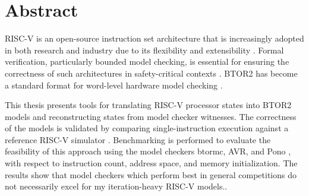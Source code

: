 \chapter*{Abstract}

RISC-V is an open-source instruction set architecture that is
increasingly adopted in both research and industry due to its
flexibility and extensibility \cite{riscv-isa, eu}. Formal
verification, particularly bounded model checking, is essential for
ensuring the correctness of such architectures in safety-critical
contexts \cite{BiereBMC}. BTOR2 has become a standard format for
word-level hardware model checking \cite{btor2, HWMCC}.

This thesis presents tools for translating RISC-V processor states
into BTOR2 models and reconstructing states from model checker
witnesses. The correctness of the models is validated by comparing
single-instruction execution against a reference RISC-V simulator
\cite{repoSim}. Benchmarking is performed to evaluate the feasibility
of this approach using the model checkers btormc, AVR, and Pono
\cite{btor2, avrPaper, ponoPaper}, with respect to instruction count,
address space, and memory initialization. The results show that model
checkers which perform best in general competitions do not
necessarily excel for my iteration-heavy RISC-V models..